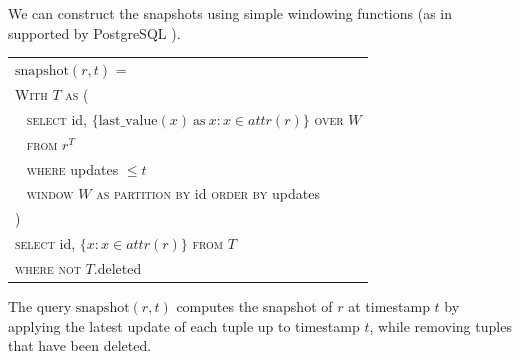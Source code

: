 We can construct the snapshots using simple windowing functions (as in supported
by PostgreSQL \cite{momjian2001postgresql}).

    \vspace{1em}
\begin{center}

{\small
	\begin{tabular}{|l|} \hline
		$\mathrm{snapshot}(r, t)$ = \\
		\verb|| \textsc{With} $T$ \textsc{as} ( \\
		\verb| | \textsc{select} id, $\{\mathrm{last\_value}(x) \mathrm{\ as\ } x:
		x\in attr(r)\}$ \textsc{over} $W$ \\
		\verb| | \textsc{from} $r^T$ \\
		\verb| | \textsc{where} updates $\leq t$ \\
		\verb| | \textsc{window} $W$ \textsc{as} 
		\textsc{partition by} id \textsc{order by} updates\\
		\verb|| ) \\
		\verb|| \textsc{select} id, $\{x: x\in attr(r)\}$ \textsc{from} $T$ \\
		\verb|| \textsc{where not} $T.$deleted \\ \hline
	\end{tabular}
}
\end{center}

The query $\mathrm{snapshot}(r, t)$ computes the snapshot of $r$ at timestamp
$t$ by applying the latest update of each tuple up to timestamp $t$, while
removing tuples that have been deleted.



